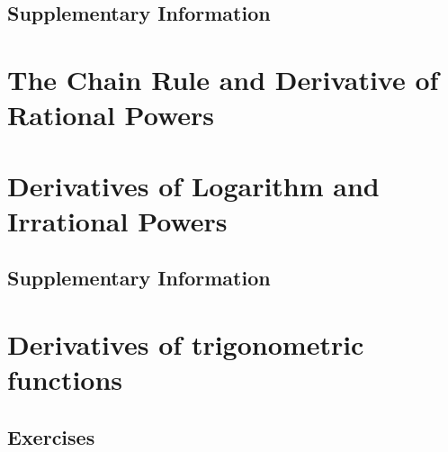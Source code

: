 \documentclass{fts_m2}
\begin{document}
    \subsection*{Supplementary Information}
    
    \fi

    \section{The Chain Rule and Derivative of Rational Powers}
    

    \section{Derivatives of Logarithm and Irrational Powers}
    
    \ifcompilesupp
    \subsection*{Supplementary Information}
    
    \fi
    
    \section{Derivatives of trigonometric functions}
    
    \ifcompilesupp
    \subsection*{Exercises}
    
    \fi
    
\end{document}
